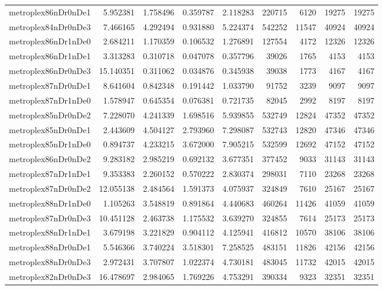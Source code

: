 \begin{longtable}{|l|r|r|r|r|r|r|r|r|}
metroplex86nDr0nDe1 & 5.952381 & 1.758496 & 0.359787 & 2.118283 & 220715 & 6120 & 19275 & 19275 \\
metroplex84nDr0nDe3 & 7.466165 & 4.292494 & 0.931880 & 5.224374 & 542252 & 11547 & 40924 & 40924 \\
metroplex86nDr1nDe0 & 2.684211 & 1.170359 & 0.106532 & 1.276891 & 127554 & 4172 & 12326 & 12326 \\
metroplex86nDr1nDe1 & 3.313283 & 0.310718 & 0.047078 & 0.357796 & 39026 & 1765 & 4153 & 4153 \\
metroplex86nDr0nDe3 & 15.140351 & 0.311062 & 0.034876 & 0.345938 & 39038 & 1773 & 4167 & 4167 \\
metroplex87nDr0nDe1 & 8.641604 & 0.842348 & 0.191442 & 1.033790 & 91752 & 3239 & 9097 & 9097 \\
metroplex87nDr1nDe0 & 1.578947 & 0.645354 & 0.076381 & 0.721735 & 82045 & 2992 & 8197 & 8197 \\
metroplex85nDr0nDe2 & 7.228070 & 4.241339 & 1.698516 & 5.939855 & 532749 & 12824 & 47352 & 47352 \\
metroplex85nDr0nDe1 & 2.443609 & 4.504127 & 2.793960 & 7.298087 & 532743 & 12820 & 47346 & 47346 \\
metroplex85nDr1nDe0 & 0.894737 & 4.233215 & 3.672000 & 7.905215 & 532599 & 12692 & 47152 & 47152 \\
metroplex86nDr0nDe2 & 9.283182 & 2.985219 & 0.692132 & 3.677351 & 377452 & 9033 & 31143 & 31143 \\
metroplex87nDr1nDe1 & 9.353383 & 2.260152 & 0.570222 & 2.830374 & 298031 & 7110 & 23268 & 23268 \\
metroplex87nDr0nDe2 & 12.055138 & 2.484564 & 1.591373 & 4.075937 & 324849 & 7610 & 25167 & 25167 \\
metroplex88nDr1nDe0 & 1.105263 & 3.548819 & 0.891864 & 4.440683 & 460264 & 11426 & 41059 & 41059 \\
metroplex87nDr0nDe3 & 10.451128 & 2.463738 & 1.175532 & 3.639270 & 324855 & 7614 & 25173 & 25173 \\
metroplex88nDr1nDe1 & 3.679198 & 3.221829 & 0.904112 & 4.125941 & 416812 & 10570 & 38106 & 38106 \\
metroplex88nDr0nDe1 & 5.546366 & 3.740224 & 3.518301 & 7.258525 & 483151 & 11826 & 42156 & 42156 \\
metroplex88nDr0nDe3 & 2.972431 & 3.707807 & 1.022374 & 4.730181 & 483045 & 11732 & 42015 & 42015 \\
metroplex82nDr0nDe3 & 16.478697 & 2.984065 & 1.769226 & 4.753291 & 390334 & 9323 & 32351 & 32351 \\

\end{longtable}
